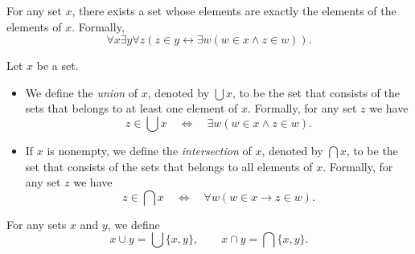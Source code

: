 \begin{axiom}[Union]
  For any set $x$, there exists a set whose elements are exactly the
  elements of the elements of $x$.
  Formally,
  \begin{equation*}
    \forall x \exists y \forall z
    (z \in y \leftrightarrow \exists w (w \in x \wedge z \in w)).
  \end{equation*}
\end{axiom}

\begin{definition}
  Let $x$ be a set.
  \begin{itemize}
    \item We define the \emph{union} of $x$, denoted by $\bigcup x$, to be the
    set that consists of the sets that belongs to at least one element of $x$.
    Formally, for any set $z$ we have
    \begin{equation*}
      z \in \bigcup x
      \quad \Leftrightarrow \quad
      \exists w (w \in x \wedge z \in w).
    \end{equation*}
    \item If $x$ is nonempty, we define the \emph{intersection} of $x$, denoted
    by $\bigcap x$, to be the set that consists of the sets that belongs to all
    elements of $x$.
    Formally, for any set $z$ we have
    \begin{equation*}
      z \in \bigcap x
      \quad \Leftrightarrow \quad
      \forall w (w \in x \to z \in w).
    \end{equation*}
  \end{itemize}
\end{definition}

\begin{definition}
  For any sets $x$ and $y$, we define
  \begin{equation*}
    x \cup y = \bigcup \{x, y\}, \qquad x \cap y = \bigcap \{x, y\}.
  \end{equation*}
\end{definition}